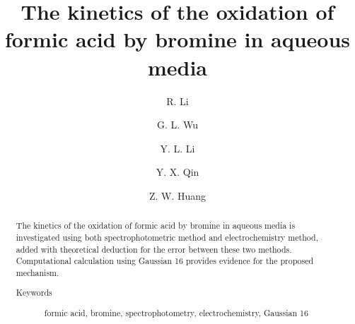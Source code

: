 \documentclass[%
preprint,
 amsmath,amssymb,
 aps,
10.5pt,
]{revtex4-1}
\begin{document}

\title{The kinetics of the oxidation of formic acid by bromine in aqueous media}%
\author{R. Li}
\author{G. L. Wu}
\author{Y. L. Li}
\author{Y. X. Qin}


\author{Z. W. Huang}
%





\begin{abstract}
The kinetics of the oxidation of formic acid by bromine in aqueous media is investigated using both spectrophotometric method and electrochemistry method, added with theoretical deduction for the error between these two methods. Computational calculation using Gaussian 16 provides evidence for the proposed mechanism.


\begin{description}
\item[Keywords] formic acid, bromine, spectrophotometry, electrochemistry, Gaussian 16

\end{description}
\end{abstract}
\end{document}
